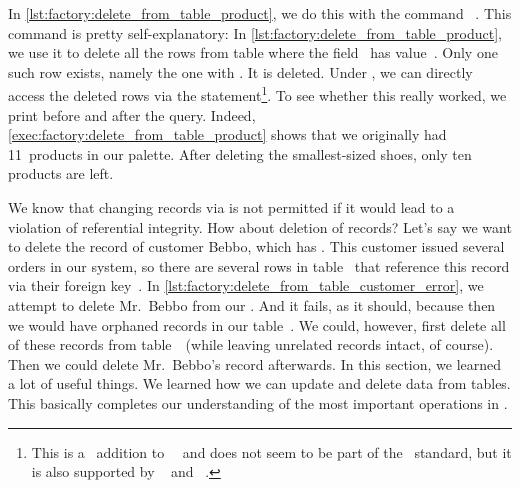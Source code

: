 In \cref{lst:factory:delete_from_table_product}, we do this with the command ~\cite{PGDG:PD:D}.
This command is pretty self-explanatory:%
%
%
%
%
%
%
%
%
%
In \cref{lst:factory:delete_from_table_product}, we use it to delete all the rows from table  where the field~ has value~.
Only one such row exists, namely the one with .
It is deleted.
Under \postgresql, we can directly access the deleted rows via the  statement\footnote{This is a \postgresql\ addition to~\sql~\cite{SE:DA:2020WDSSOAOTNPSDIOR} and does not seem to be part of the \sql\ standard, but it is also supported by \mariadb~\cite{M:MSD:D} and \sqlite~\cite{HWACIS:R}.}.
To see whether this really worked, we print  before and after the  query.
Indeed, \cref{exec:factory:delete_from_table_product} shows that we originally had 11~products in our palette.
After deleting the smallest-sized shoes, only ten products are left.

We know that changing records via  is not permitted if it would lead to a violation of referential integrity.
How about deletion of records?
Let's say we want to delete the record of customer Bebbo, which has .
This customer issued several orders in our system, so there are several rows in table~ that reference this record via their foreign key~.
In \cref{lst:factory:delete_from_table_customer_error}, we attempt to delete Mr.~Bebbo from our \db.
And it fails, as it should, because then we would have orphaned records in our table~.
We could, however, first delete all of these records from table~~(while leaving unrelated records intact, of course).
Then we could delete Mr.~Bebbo's  record afterwards.%
%
\endhsection%
%
%
In this section, we learned a lot of useful things.
We learned how we can update and delete data from tables.
This basically completes our understanding of the most important operations in \sql.

